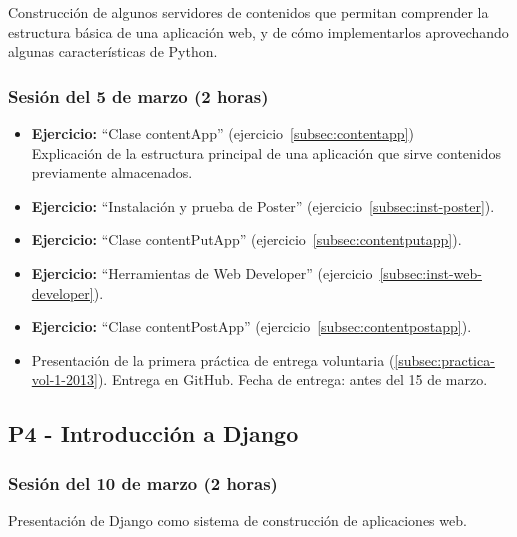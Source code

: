 \documentclass[a4paper,12pt]{article}
\begin{document}
Construcción de algunos servidores de contenidos que permitan comprender la estructura básica de una aplicación web, y de cómo implementarlos aprovechando algunas características de Python.

\subsubsection{Sesión del 5 de marzo (2 horas)}

\begin{itemize}
 \item \textbf{Ejercicio:}  ``Clase contentApp'' (ejercicio~\ref{subsec:contentapp}) \\
   Explicación de la estructura principal de una aplicación que sirve contenidos previamente almacenados.
 \item \textbf{Ejercicio:} ``Instalación y prueba de Poster'' (ejercicio~\ref{subsec:inst-poster}).
 \item \textbf{Ejercicio:} ``Clase contentPutApp'' (ejercicio~\ref{subsec:contentputapp}).
  \item \textbf{Ejercicio:} ``Herramientas de Web Developer'' (ejercicio~\ref{subsec:inst-web-developer}).
 \item \textbf{Ejercicio:} ``Clase contentPostApp'' (ejercicio~\ref{subsec:contentpostapp}).
  \item Presentación de la primera práctica de entrega voluntaria (\ref{subsec:practica-vol-1-2013}). Entrega en GitHub. Fecha de entrega: antes del 15 de marzo.
\end{itemize}


\subsection{P4 - Introducción a Django}

\subsubsection{Sesión del 10 de marzo (2 horas)}

Presentación de Django como sistema de construcción de aplicaciones web.
\end{document}
